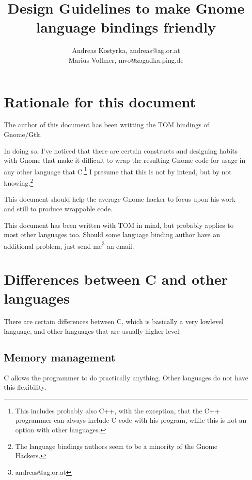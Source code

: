 \documentclass{article}
\begin{document}
\title{Design Guidelines to make Gnome language bindings friendly}
\author{Andreas Kostyrka, andreas@ag.or.at\\Marius Vollmer, mvo@zagadka.ping.de}
\maketitle
\tableofcontents
\section{Rationale for this document}
The author of this document has been writting the TOM bindings of
Gnome/Gtk.

In doing so, I've noticed that there are certain constructs and
designing habits with Gnome that make it difficult to wrap the
resulting Gnome code for usage in any other language that
C.\footnote{This includes probably also C++, with the exception, that
the C++ programmer can always include C code with his program, while
this is not an option with other languages.}
I presume that this is not by intend, but by not knowing.\footnote{The
language bindings authors seem to be a minority of the Gnome Hackers.}

This document should help the average Gnome hacker to focus upon his
work and still to produce wrappable code.

This document has been written with TOM in mind, but probably applies
to most other languages too. Should some language binding author have
an additional problem, just send me\footnote{andreas@ag.or.at} an
email.

\section{Differences between C and other languages}

There are certain differences between C, which is basically a very
lowlevel language, and other languages that are usually higher level.

\subsection{Memory management}

C allows the programmer to do practically anything. Other languages do
not have this flexibility.
\end{document}
